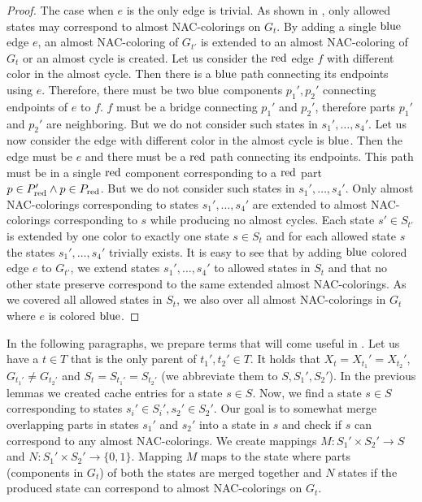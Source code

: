 \begin{proof}
	The case when \( e \) is the only edge is trivial.
	As shown in ,
	only allowed states may correspond to almost NAC-colorings on \( G_t \).
	By adding a single \( \text{blue} \) edge \( e \),
	an almost NAC-coloring of \( G_{t'} \)
	is extended to an almost NAC-coloring of \( G_t \)
	or an almost cycle is created.
	Let us consider the \( \text{red} \) edge \( f \) with different color in the almost cycle.
	Then there is a \( \text{blue} \) path connecting its endpoints using \( e \).
	Therefore, there must be two \( \text{blue} \) components \( p_1', p_2' \)
	connecting endpoints of \( e \) to \( f \).
	\( f \) must be a bridge connecting \( p_1' \) and \( p_2' \),
	therefore parts \( p_1' \) and \( p_2' \) are neighboring.
	But we do not consider such states in \( s_1', \dots, s_4' \).
	Let us now consider the edge with different color in the almost cycle is \( \text{blue} \).
	Then the edge must be \( e \) and there must be a \( \text{red} \) path connecting its endpoints.
	This path must be in a single \( \text{red} \) component corresponding
	to a \( \text{red} \) part \( p \in P_{\text{red}}' \land p \in P_{\text{red}} \).
	But we do not consider such states in \( s_1', \dots, s_4' \).
	Only almost NAC-colorings
	corresponding to states \( s_1', \dots, s_4' \)
	are extended to almost NAC-colorings corresponding to \( s \)
	while producing no almost cycles.
	Each state \( s' \in S_{t'} \) is extended by one color
	to exactly one state \( s \in S_t \) and for each allowed state \( s \)
	the states \( s_1', \dots, s_4' \) trivially exists.
	It is easy to see that by adding \( \text{blue} \) colored edge \( e \) to \( G_{t'} \),
	we extend states \( s_1', \dots, s_4' \) to allowed states in \( S_{t} \)
	and that no other state preserve correspond to the same extended almost NAC-colorings.
	As we covered all allowed states in \( S_t \),
	we also over all almost NAC-colorings in \( G_t \) where \( e \) is colored \( \text{blue} \).
\end{proof}

In the following paragraphs,
we prepare terms that will come useful in .
Let us have a \JoinNode{} \( t \in T \) that is
the only parent of \( t_1', t_2' \in T \).
It holds that \( X_t = X_{t_1}' = X_{t_2}' \),
\( G_{t_1'} \ne G_{t_2'} \)
and \( S_t = S_{t_1'} = S_{t_2'} \)
(we abbreviate them to \( S, S_1', S_2' \)).
%
In the previous lemmas we created cache entries for a state \( s \in S \).
Now, we find a state \( s \in S \) corresponding to states \( s_i' \in S_i', s_2' \in S_2' \).
Our goal is to somewhat merge overlapping parts in states \( s_1' \) and \( s_2' \)
into a state in \( s \) and check if \( s \) can correspond to any almost NAC-colorings.
%
We create mappings \( M: S_1' \times S_2' \to S \) and \( N: S_1' \times S_2' \to \{0, 1\} \).
Mapping \( M \) maps to the state where parts (components in \( G_t \)) of both the states
are merged together and \( N \) states if the produced state
can correspond to almost NAC-colorings on \( G_t \).


